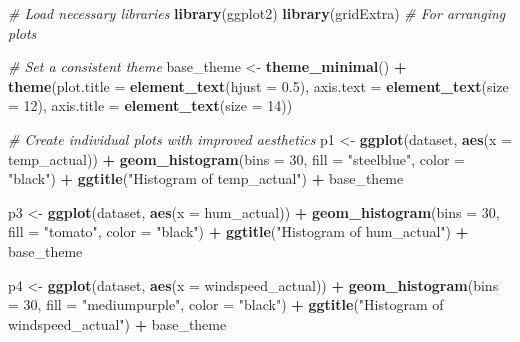 \documentclass[
]{article}
\newenvironment{Shaded}{\begin{snugshade}}{\end{snugshade}}
\newcommand{\AttributeTok}[1]{\textcolor[rgb]{0.13,0.29,0.53}{#1}}
\newcommand{\CommentTok}[1]{\textcolor[rgb]{0.56,0.35,0.01}{\textit{#1}}}
\newcommand{\DecValTok}[1]{\textcolor[rgb]{0.00,0.00,0.81}{#1}}
\newcommand{\FloatTok}[1]{\textcolor[rgb]{0.00,0.00,0.81}{#1}}
\newcommand{\FunctionTok}[1]{\textcolor[rgb]{0.13,0.29,0.53}{\textbf{#1}}}
\newcommand{\NormalTok}[1]{#1}
\newcommand{\OtherTok}[1]{\textcolor[rgb]{0.56,0.35,0.01}{#1}}
\newcommand{\SpecialCharTok}[1]{\textcolor[rgb]{0.81,0.36,0.00}{\textbf{#1}}}
\newcommand{\StringTok}[1]{\textcolor[rgb]{0.31,0.60,0.02}{#1}}
\begin{document}
\begin{Shaded}
\begin{Highlighting}[]
\CommentTok{\# Load necessary libraries}
\FunctionTok{library}\NormalTok{(ggplot2)}
\FunctionTok{library}\NormalTok{(gridExtra) }\CommentTok{\# For arranging plots}

\CommentTok{\# Set a consistent theme}
\NormalTok{base\_theme }\OtherTok{\textless{}{-}} \FunctionTok{theme\_minimal}\NormalTok{() }\SpecialCharTok{+} 
              \FunctionTok{theme}\NormalTok{(}\AttributeTok{plot.title =} \FunctionTok{element\_text}\NormalTok{(}\AttributeTok{hjust =} \FloatTok{0.5}\NormalTok{),}
                    \AttributeTok{axis.text =} \FunctionTok{element\_text}\NormalTok{(}\AttributeTok{size =} \DecValTok{12}\NormalTok{),}
                    \AttributeTok{axis.title =} \FunctionTok{element\_text}\NormalTok{(}\AttributeTok{size =} \DecValTok{14}\NormalTok{))}

\CommentTok{\# Create individual plots with improved aesthetics}
\NormalTok{p1 }\OtherTok{\textless{}{-}} \FunctionTok{ggplot}\NormalTok{(dataset, }\FunctionTok{aes}\NormalTok{(}\AttributeTok{x =}\NormalTok{ temp\_actual)) }\SpecialCharTok{+}
      \FunctionTok{geom\_histogram}\NormalTok{(}\AttributeTok{bins =} \DecValTok{30}\NormalTok{, }\AttributeTok{fill =} \StringTok{"steelblue"}\NormalTok{, }\AttributeTok{color =} \StringTok{"black"}\NormalTok{) }\SpecialCharTok{+}
      \FunctionTok{ggtitle}\NormalTok{(}\StringTok{"Histogram of temp\_actual"}\NormalTok{) }\SpecialCharTok{+}
\NormalTok{      base\_theme}

\NormalTok{p3 }\OtherTok{\textless{}{-}} \FunctionTok{ggplot}\NormalTok{(dataset, }\FunctionTok{aes}\NormalTok{(}\AttributeTok{x =}\NormalTok{ hum\_actual)) }\SpecialCharTok{+}
      \FunctionTok{geom\_histogram}\NormalTok{(}\AttributeTok{bins =} \DecValTok{30}\NormalTok{, }\AttributeTok{fill =} \StringTok{"tomato"}\NormalTok{, }\AttributeTok{color =} \StringTok{"black"}\NormalTok{) }\SpecialCharTok{+}
      \FunctionTok{ggtitle}\NormalTok{(}\StringTok{"Histogram of hum\_actual"}\NormalTok{) }\SpecialCharTok{+}
\NormalTok{      base\_theme}

\NormalTok{p4 }\OtherTok{\textless{}{-}} \FunctionTok{ggplot}\NormalTok{(dataset, }\FunctionTok{aes}\NormalTok{(}\AttributeTok{x =}\NormalTok{ windspeed\_actual)) }\SpecialCharTok{+}
      \FunctionTok{geom\_histogram}\NormalTok{(}\AttributeTok{bins =} \DecValTok{30}\NormalTok{, }\AttributeTok{fill =} \StringTok{"mediumpurple"}\NormalTok{, }\AttributeTok{color =} \StringTok{"black"}\NormalTok{) }\SpecialCharTok{+}
      \FunctionTok{ggtitle}\NormalTok{(}\StringTok{"Histogram of windspeed\_actual"}\NormalTok{) }\SpecialCharTok{+}
\NormalTok{      base\_theme}


\end{Highlighting}
\end{Shaded}
\end{document}
